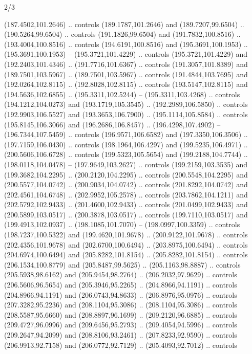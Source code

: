 \begin{flagdescription}{2/3}
\begin{scope}[xshift=0.5\flaglength,yshift=0.5\flagwidth,scale=\flagwidth/180]
\begin{scope}[y=0.8pt, x=0.8pt, yscale=-1,shift={(-168.75,-108.75)}]
  (187.4502,101.2646) .. controls (189.1787,101.2646) and (189.7207,99.6504) ..
  (190.5264,99.6504) .. controls (191.1826,99.6504) and (191.7832,100.8516) ..
  (193.4004,100.8516) .. controls (194.6191,100.8516) and (195.3691,100.1953) ..
  (195.3691,100.1953) -- (195.3721,101.4229) .. controls (195.3721,101.4229) and
  (192.2403,101.4346) .. (191.7716,101.6367) .. controls (191.3057,101.8389) and
  (189.7501,103.5967) .. (189.7501,103.5967) .. controls (191.4844,103.7695) and
  (192.0264,102.8115) .. (192.8028,102.8115) .. controls (193.5147,102.8115) and
  (194.5636,102.6855) .. (195.3311,102.5244) -- (195.3311,103.4268) .. controls
  (194.1212,104.0273) and (193.1719,105.3545) .. (192.2989,106.5850) .. controls
  (192.9903,106.5527) and (193.3653,106.7900) .. (195.1114,105.8584) .. controls
  (195.8145,106.3066) and (196.2686,106.8457) .. (196.4298,107.4902) --
  (196.7344,107.5459) .. controls (196.9571,106.6582) and (197.3350,106.3506) ..
  (197.7159,106.0430) .. controls (198.1964,106.4297) and (199.5235,106.4971) ..
  (200.5606,106.6728) .. controls (199.5323,105.5654) and (199.2188,104.7744) ..
  (198.0118,104.0478) -- (197.9649,103.2627) .. controls (199.2159,103.3535) and
  (199.3682,104.2295) .. (200.2120,104.2295) .. controls (200.5548,104.2295) and
  (200.5577,104.0742) .. (200.9034,104.0742) .. controls (201.8292,104.0742) and
  (202.4561,104.6748) .. (202.9952,105.2578) .. controls (203.7862,104.1211) and
  (202.5792,102.9433) .. (201.4600,102.9433) .. controls (201.0499,102.9433) and
  (200.5899,103.0517) .. (200.3878,103.0517) .. controls (199.7110,103.0517) and
  (199.4913,102.0937) .. (198.1085,101.7070) -- (198.0997,100.3359) .. controls
  (198.7237,100.5322) and (199.4620,101.9678) .. (200.9122,101.9678) .. controls
  (202.4356,101.9678) and (202.6700,100.6494) .. (203.8975,100.6494) .. controls
  (204.6974,100.6494) and (205.8282,101.8154) .. (205.8282,101.8154) .. controls
  (206.1534,100.8779) and (205.8487,99.5625) .. (205.1163,98.8887) .. controls
  (205.5938,98.6162) and (205.9454,98.2764) .. (206.2032,97.9629) .. controls
  (206.5606,96.5654) and (205.3946,95.2265) .. (204.8966,94.1191) .. controls
  (204.8966,94.1191) and (206.0743,94.8633) .. (206.8976,95.0976) .. controls
  (207.3282,95.2236) and (208.1104,95.3086) .. (208.1104,95.3086) .. controls
  (208.5587,95.6660) and (208.8897,96.1699) .. (209.2120,96.6885) .. controls
  (209.4727,96.0996) and (209.6456,95.2793) .. (209.4054,94.5996) .. controls
  (209.2647,94.2099) and (208.8106,93.2461) .. (207.8233,92.9590) .. controls
  (206.9913,92.7158) and (206.0772,92.7129) .. (205.4093,92.7012) .. controls

\end{scope}
\end{scope}
\end{flagdescription}
